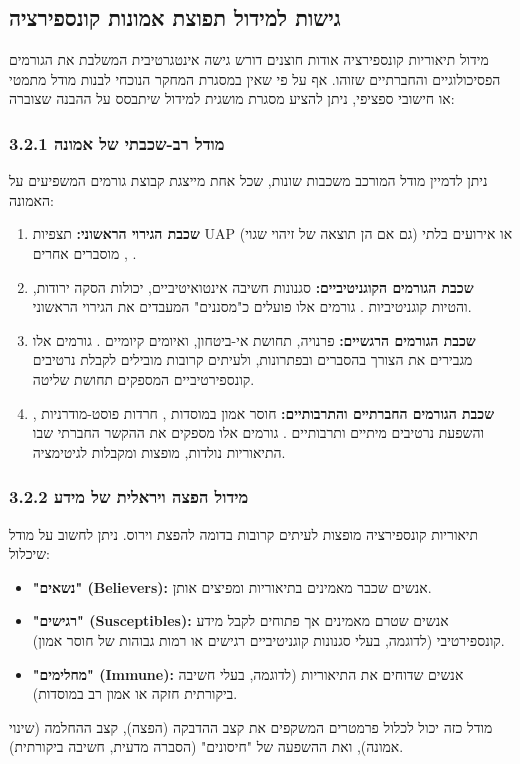\documentclass[12pt,a4paper]{article}
\begin{document}
\subsection{גישות למידול תפוצת אמונות קונספירציה}

מידול תיאוריות קונספירציה אודות חוצנים דורש גישה אינטגרטיבית המשלבת את הגורמים הפסיכולוגיים והחברתיים שזוהו. אף על פי שאין במסגרת המחקר הנוכחי לבנות מודל מתמטי או חישובי ספציפי, ניתן להציע מסגרת מושגית למידול שיתבסס על ההבנה שצוברה:

\subsubsection*{3.2.1 מודל רב-שכבתי של אמונה}
ניתן לדמיין מודל המורכב משכבות שונות, שכל אחת מייצגת קבוצת גורמים המשפיעים על האמונה:
\begin{enumerate}
    \item \textbf{שכבת הגירוי הראשוני:} תצפיות UAP (גם אם הן תוצאה של זיהוי שגוי) או אירועים בלתי מוסברים אחרים \cite{aaro2024misidentification}, \cite{aaro2024noevidence}.
    \item \textbf{שכבת הגורמים הקוגניטיביים:} סגנונות חשיבה אינטואיטיביים, יכולות הסקה ירודות, והטיות קוגניטיביות \cite{biddlestone2025conspiracy}. גורמים אלו פועלים כ"מסננים" המעבדים את הגירוי הראשוני.
    \item \textbf{שכבת הגורמים הרגשיים:} פרנויה, תחושת אי-ביטחון, ואיומים קיומיים \cite{bowes2023conspiracy, biddlestone2025conspiracy}. גורמים אלו מגבירים את הצורך בהסברים ובפתרונות, ולעיתים קרובות מובילים לקבלת נרטיבים קונספירטיביים המספקים תחושת שליטה.
    \item \textbf{שכבת הגורמים החברתיים והתרבותיים:} חוסר אמון במוסדות \cite{bowes2023conspiracy}, חרדות פוסט-מודרניות \cite{ellwood1999ufo}, והשפעת נרטיבים מיתיים ותרבותיים \cite{wojcik2021cosmologies}. גורמים אלו מספקים את ההקשר החברתי שבו התיאוריות נולדות, מופצות ומקבלות לגיטימציה.
\end{enumerate}

\subsubsection*{3.2.2 מידול הפצה ויראלית של מידע}
תיאוריות קונספירציה מופצות לעיתים קרובות בדומה להפצת וירוס. ניתן לחשוב על מודל שיכלול:
\begin{itemize}
    \item \textbf{"נשאים" (Believers):} אנשים שכבר מאמינים בתיאוריות ומפיצים אותן.
    \item \textbf{"רגישים" (Susceptibles):} אנשים שטרם מאמינים אך פתוחים לקבל מידע קונספירטיבי (לדוגמה, בעלי סגנונות קוגניטיביים רגישים או רמות גבוהות של חוסר אמון).
    \item \textbf{"מחלימים" (Immune):} אנשים שדוחים את התיאוריות (לדוגמה, בעלי חשיבה ביקורתית חזקה או אמון רב במוסדות).
\end{itemize}
מודל כזה יכול לכלול פרמטרים המשקפים את קצב ההדבקה (הפצה), קצב ההחלמה (שינוי אמונה), ואת ההשפעה של "חיסונים" (הסברה מדעית, חשיבה ביקורתית).
\end{document}
